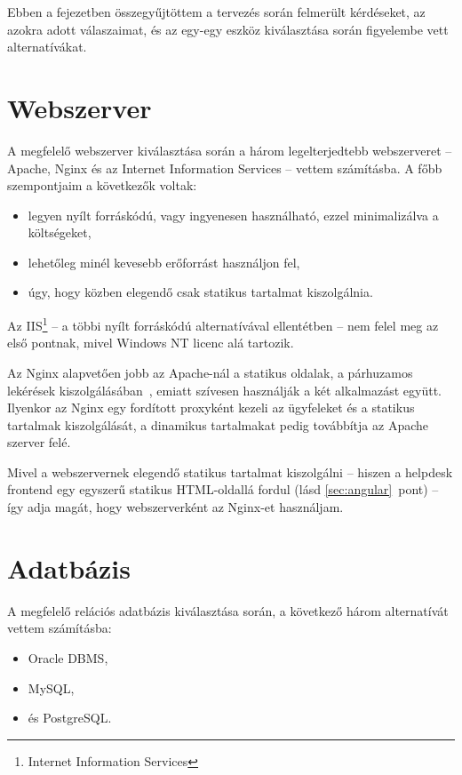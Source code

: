 Ebben a fejezetben összegyűjtöttem a tervezés során felmerült kérdéseket, az azokra adott válaszaimat, és az egy-egy eszköz kiválasztása során figyelembe vett alternatívákat.



\section{Webszerver}
A megfelelő webszerver kiválasztása során a három legelterjedtebb\cite{W3Techs_Usage_statistics_of_webservers} webszerveret --  Apache, Nginx és az Internet Information Services -- vettem számításba. A főbb szempontjaim a következők voltak:
\begin{itemize}
	\item legyen nyílt forráskódú, vagy ingyenesen használható, ezzel minimalizálva a költségeket,
	\item lehetőleg minél kevesebb erőforrást használjon fel,
	\item úgy, hogy közben elegendő csak statikus tartalmat kiszolgálnia.
\end{itemize}

Az IIS\footnote{Internet Information Services} --  a többi nyílt forráskódú alternatívával ellentétben --   nem felel meg az első pontnak, mivel Windows NT licenc alá tartozik.

Az Nginx alapvetően jobb az Apache-nál a statikus oldalak, a párhuzamos lekérések kiszolgálásában~\cite{nginx_performance}, emiatt szívesen használják a két alkalmazást együtt. Ilyenkor az Nginx egy fordított proxyként kezeli az ügyfeleket és a statikus tartalmak kiszolgálását, a dinamikus tartalmakat pedig továbbítja az Apache szerver felé.

Mivel a webszervernek elegendő statikus tartalmat kiszolgálni --  hiszen a helpdesk frontend egy egyszerű statikus HTML-oldallá fordul (lásd \ref{sec:angular}~pont) --   így adja magát, hogy webszerverként az Nginx-et használjam.




\section{Adatbázis}
A megfelelő relációs adatbázis kiválasztása során, a következő három alternatívát vettem számításba:
\begin{itemize}
	\item Oracle DBMS,
	\item MySQL,
	\item és PostgreSQL.
\end{itemize}

